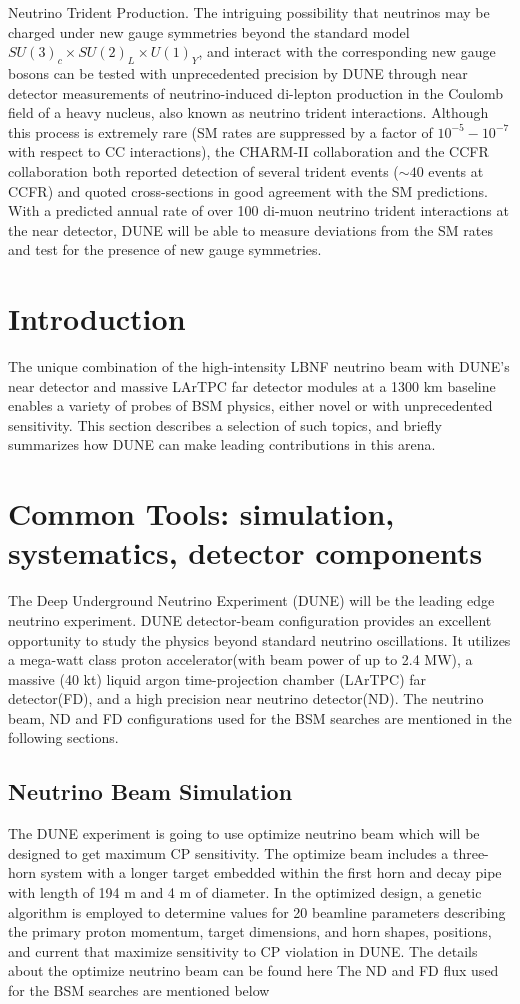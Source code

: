 Neutrino Trident Production. The intriguing possibility that neutrinos may be charged under new gauge symmetries beyond the standard model $SU(3)_{c} \times SU(2)_{L} \times U(1)_{Y}$, and interact with the corresponding new gauge bosons can be tested with unprecedented precision by DUNE through near detector measurements of neutrino-induced di-lepton production in the Coulomb field of a heavy nucleus, also known as neutrino trident interactions. Although this process is extremely rare (SM rates are suppressed by a factor of $10^{-5} - 10^{-7}$ with respect to CC interactions), the CHARM-II collaboration and the CCFR collaboration both reported detection of several trident events ($\sim 40$ events at CCFR) and quoted cross-sections in good agreement with the SM predictions. With a predicted annual rate of over 100 di-muon neutrino trident interactions at the near detector, DUNE will be able to measure deviations from the SM rates and test for the presence of new gauge symmetries.

\section{Introduction}
The unique combination of the high-intensity LBNF neutrino beam with DUNE's near detector and massive LArTPC far detector modules at a 1300 km baseline enables a variety of probes of BSM physics, either novel or with unprecedented sensitivity. This section describes a selection of such topics, and briefly summarizes how DUNE can make leading contributions in this arena.

\section{Common Tools: simulation, systematics, detector components}
The Deep Underground Neutrino Experiment (DUNE) will be the leading edge neutrino experiment. DUNE detector-beam configuration  provides an excellent opportunity to study the physics beyond standard neutrino
oscillations. It utilizes a mega-watt class proton accelerator(with beam power of up to 2.4 MW), a massive (40 kt) liquid argon time-projection chamber (LArTPC) far detector(FD), and a high precision near neutrino detector(ND). The neutrino beam, ND and FD configurations used for the BSM searches are mentioned in the following sections.
\subsection{Neutrino Beam Simulation}
The DUNE experiment is going to use optimize neutrino beam which will be designed to get maximum CP sensitivity. The optimize beam includes  a three-horn system with a longer target embedded within the first horn and decay pipe with length of 194 m and 4 m of diameter. In the optimized design, a genetic algorithm is employed to determine values for 20 beamline parameters describing the primary proton momentum, target dimensions, and horn shapes, positions, and current that maximize sensitivity to CP violation in DUNE. The details about the optimize neutrino beam can be found here\cite{Laura:2017} The ND and FD flux used for the BSM searches are mentioned below 

